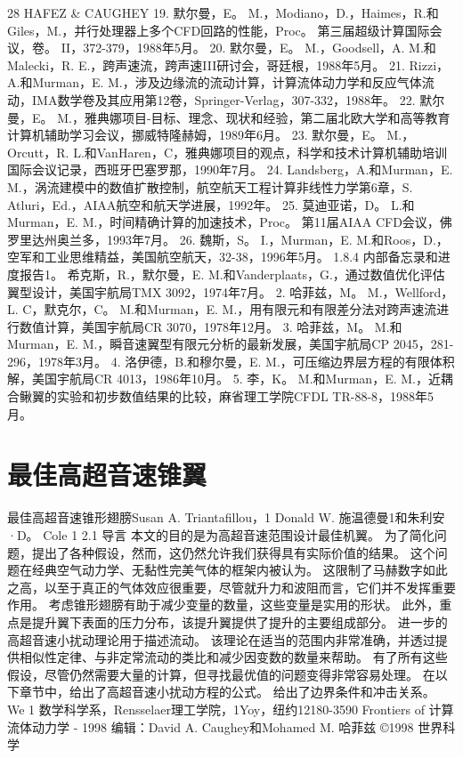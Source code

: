\documentclass[UTF8,11pt,a4paper,openany,fontset=fandol]{ctexbook}
\begin{document}
28 HAFEZ \& CAUGHEY 19. 默尔曼，E。 M.，Modiano，D.，Haimes，R.和Giles，M.，并行处理器上多个CFD回路的性能，Proc。 第三届超级计算国际会议，卷。 II，372-379，1988年5月。 20. 默尔曼，E。 M.，Goodsell，A. M.和Malecki，R. E.，跨声速流，跨声速III研讨会，哥廷根，1988年5月。 21. Rizzi，A.和Murman，E. M.，涉及边缘流的流动计算，计算流体动力学和反应气体流动，IMA数学卷及其应用第12卷，Springer-Verlag，307-332，1988年。 22. 默尔曼，E。 M.，雅典娜项目-目标、理念、现状和经验，第二届北欧大学和高等教育计算机辅助学习会议，挪威特隆赫姆，1989年6月。 23. 默尔曼，E。 M.，Orcutt，R. L.和VanHaren，C，雅典娜项目的观点，科学和技术计算机辅助培训国际会议记录，西班牙巴塞罗那，1990年7月。 24. Landsberg，A.和Murman，E. M.，涡流建模中的数值扩散控制，航空航天工程计算非线性力学第6章，S. Atluri，Ed.，AIAA航空和航天学进展，1992年。 25. 莫迪亚诺，D。 L.和Murman，E. M.，时间精确计算的加速技术，Proc。 第11届AIAA CFD会议，佛罗里达州奥兰多，1993年7月。 26. 魏斯，S。 I.，Murman，E. M.和Roos，D.，空军和工业思维精益，美国航空航天，32-38，1996年5月。 1.8.4 内部备忘录和进度报告1。 希克斯，R.，默尔曼，E. M.和Vanderplaats，G.，通过数值优化评估翼型设计，美国宇航局TMX 3092，1974年7月。 2. 哈菲兹，M。 M.，Wellford，L. C，默克尔，C。 M.和Murman，E. M.，用有限元和有限差分法对跨声速流进行数值计算，美国宇航局CR 3070，1978年12月。 3. 哈菲兹，M。 M.和Murman，E. M.，瞬音速翼型有限元分析的最新发展，美国宇航局CP 2045，281-296，1978年3月。 4. 洛伊德，B.和穆尔曼，E. M.，可压缩边界层方程的有限体积解，美国宇航局CR 4013，1986年10月。 5. 李，K。 M.和Murman，E. M.，近耦合鳅翼的实验和初步数值结果的比较，麻省理工学院CFDL TR-88-8，1988年5月。

\clearpage
\chapter{最佳高超音速锥翼}
最佳高超音速锥形翅膀Susan A. Triantafillou，1 Donald W. 施温德曼1和朱利安·D。 Cole 1 2.1 导言 本文的目的是为高超音速范围设计最佳机翼。 为了简化问题，提出了各种假设，然而，这仍然允许我们获得具有实际价值的结果。 这个问题在经典空气动力学、无黏性完美气体的框架内被认为。 这限制了马赫数字如此之高，以至于真正的气体效应很重要，尽管就升力和波阻而言，它们并不发挥重要作用。 考虑锥形翅膀有助于减少变量的数量，这些变量是实用的形状。 此外，重点是提升翼下表面的压力分布，该提升翼提供了提升的主要组成部分。 进一步的高超音速小扰动理论用于描述流动。 该理论在适当的范围内非常准确，并透过提供相似性定律、与非定常流动的类比和减少因变数的数量来帮助。 有了所有这些假设，尽管仍然需要大量的计算，但寻找最优值的问题变得非常容易处理。 在以下章节中，给出了高超音速小扰动方程的公式。 给出了边界条件和冲击关系。 We 1 数学科学系，Rensselaer理工学院，1Yoy，纽约12180-3590 Frontiers of 计算流体动力学 - 1998 编辑：David A. Caughey和Mohamed M. 哈菲兹 ©1998 世界科学
\end{document}
